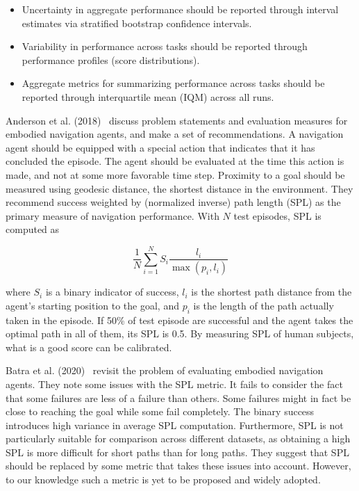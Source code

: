 \begin{itemize}
    \item Uncertainty in aggregate performance should be reported through interval estimates via stratified bootstrap confidence intervals.
    \item Variability in performance across tasks should be reported through performance profiles (score distributions).
    \item Aggregate metrics for summarizing performance across tasks should be reported through interquartile mean (IQM) across all runs.
\end{itemize}

Anderson et al. (2018)~\cite{anderson_evaluation_2018} discuss problem statements and evaluation measures for embodied navigation agents, and make a set of recommendations.
A navigation agent should be equipped with a special action that indicates that it has concluded the episode.
The agent should be evaluated at the time this action is made, and not at some more favorable time step. %
Proximity to a goal should be measured using geodesic distance, the shortest distance in the environment. %
They recommend success weighted by (normalized inverse) path length (SPL) as the primary measure of navigation performance.
With \(N\) test episodes, SPL is computed as 

\begin{equation}
    \frac{1}{N} \sum_{i=1}^N S_i \frac{l_i}{\max(p_i, l_i)}
\end{equation}


where \(S_i\) is a binary indicator of success,
\(l_i\) is the shortest path distance from the agent's starting position to the goal,
and \(p_i\) is the length of the path actually taken in the episode.
If 50\% of test episode are successful and the agent takes the optimal path in all of them, its SPL is 0.5.
By measuring SPL of human subjects, what is a good score can be calibrated.

Batra et al. (2020)~\cite{batra_evaluation_2020} revisit the problem of evaluating embodied navigation agents.
They note some issues with the SPL metric.
It fails to consider the fact that some failures are less of a failure than others.
Some failures might in fact be close to reaching the goal while some fail completely.
The binary success introduces high variance in average SPL computation.
Furthermore, SPL is not particularly suitable for comparison across different datasets,
as obtaining a high SPL is more difficult for short paths than for long paths.
They suggest that SPL should be replaced by some metric that takes these issues into account.
However, to our knowledge such a metric is yet to be proposed and widely adopted.